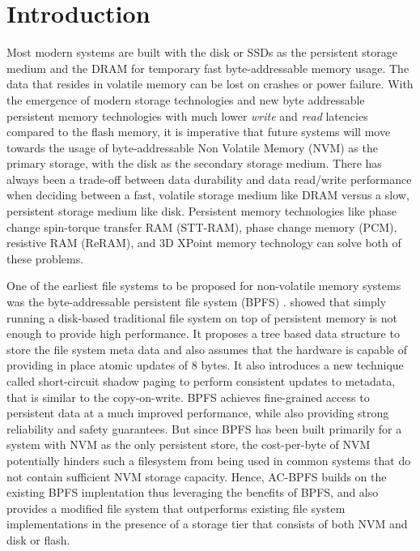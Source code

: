 \section{Introduction}
\label{sec-intro}
Most modern systems are built with the disk or SSDs as the persistent storage medium and the DRAM for temporary fast byte-addressable memory usage. The data that resides in volatile memory can be lost on crashes or power failure. With the emergence of modern storage technologies and new byte addressable persistent memory technologies with much lower \textit{write} and \textit{read} latencies compared to the flash memory, it is imperative that future systems will move towards the usage of byte-addressable Non Volatile Memory (NVM) as the primary storage, with the disk as the secondary storage medium. There has always been a trade-off between data durability and data read/write performance when deciding between a fast, volatile storage medium like DRAM versus a slow, persistent storage medium like disk. Persistent memory technologies like phase change spin-torque transfer RAM (STT-RAM), phase change memory (PCM), resistive RAM (ReRAM), and 3D XPoint memory technology can solve both of these problems.

One of the earliest file systems to be proposed for non-volatile memory systems was the byte-addressable persistent file system (BPFS) \cite{c10}. \cite{c10} showed that simply running a disk-based traditional file system on top of persistent memory is not enough to provide high performance. It proposes a tree based data structure to store the file system meta data and also assumes that the hardware is capable of providing in place atomic updates of 8 bytes. It also introduces a new technique called short-circuit shadow paging to perform consistent updates to metadata, that is similar to the copy-on-write. BPFS achieves fine-grained access to persistent data at a much improved performance, while also providing strong reliability and safety guarantees. But since BPFS has been built primarily for a system with NVM as the only persistent store, the cost-per-byte of NVM potentially hinders such a filesystem from being used in common systems that do not contain sufficient NVM storage capacity. Hence, AC-BPFS builds on the existing BPFS implentation thus leveraging the benefits of BPFS, and also provides a modified file system that outperforms existing file system implementations in the presence of a storage tier that consists of both NVM and disk or flash.

